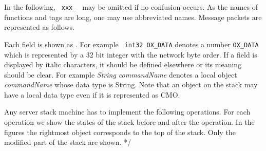 In the following, \verb+ xxx_ + may be omitted if no confusion occurs.
As the names of functions and tags are long, one may use abbreviated
names.  Message packets are represented as follows.

Each field is shown as .  For example {\tt
int32 OX\_DATA} denotes a number {\tt OX\_DATA} which is represented
by a 32 bit integer with the network byte order.  If a field is
displayed by italic characters, it should be defined elsewhere or its
meaning should be clear.  For example {\it String commandName} denotes
a local object {\it commandName} whose data type is String.  Note that
an object on the stack may have a local data type even if it is
represented as CMO. 

Any server stack machine has to implement the following operations.
For each operation we show the states of the stack before and after
the operation. In the figures the rightmost object corresponds to the
top of the stack. Only the modified part of the stack are shown.
*/


